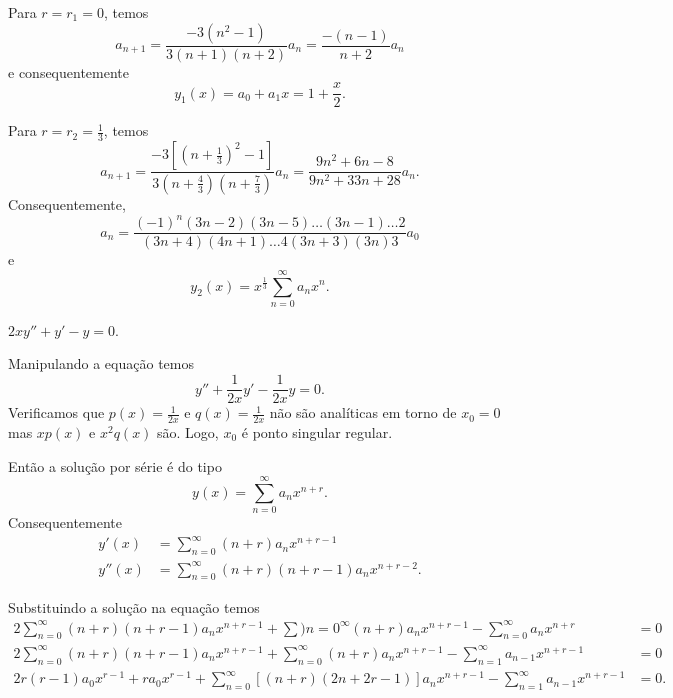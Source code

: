 \documentclass[a4paper,12pt, leqno, answers]{exam}
\begin{document}
\begin{questions}
\begin{solution}
        Para $r = r_1 = 0$, temos
        \[
        a_{n + 1} = \frac{-3 \left( n^2 - 1 \right)}{3 \left( n + 1 \right) \left( n + 2 \right)} a_n = \frac{-\left( n - 1 \right)}{n + 2} a_n
        \]
        e consequentemente
        \[
        y_1(x) = a_0 + a_1 x = 1 + \frac{x}{2}.
        \]

        Para $r = r_2 = \frac{1}{3}$, temos
        \[
        a_{n + 1} = \frac{-3\left[ \left( n + \frac{1}{3} \right)^2 - 1 \right]}{3 \left( n + \frac{4}{3} \right) \left( n + \frac{7}{3} \right)} a_n = \frac{9n^2 + 6n - 8}{9n^2 + 33 n + 28} a_n.
        \]
        Consequentemente,
        \[
        a_n = \frac{\left( -1 \right)^n \left( 3n - 2 \right) \left( 3n - 5 \right) \ldots \left( 3n - 1 \right) \ldots 2}{\left( 3n + 4 \right) \left( 4n + 1 \right) \ldots 4 \left( 3n + 3 \right) \left( 3n \right) 3} a_0
        \]
        e
        \[
        y_2(x) = x^{\frac{1}{3}} \sum_{n = 0}^\infty a_n x^n.
        \]
    \end{solution}

    \question $2 x y'' + y' - y = 0$.
    \begin{solution}
        Manipulando a equa\c{c}\~{a}o temos
        \[
        y'' + \frac{1}{2x} y' - \frac{1}{2x} y = 0.
        \]
        Verificamos que $p(x) = \frac{1}{2x}$ e $q(x) = \frac{1}{2x}$ n\~{a}o s\~{a}o anal\'{i}ticas em torno de $x_0 = 0$ mas $x p(x)$ e $x^2 q(x)$ s\~{a}o. Logo, $x_0$ \'{e} ponto singular regular.

        Ent\~{a}o a solu\c{c}\~{a}o por s\'{e}rie \'{e} do tipo
        \[
        y\left( x \right) = \sum_{n = 0}^\infty a_n x^{n + r}.
        \]
        Consequentemente
        \begin{align*}
            y'(x) &= \sum_{n = 0}^\infty \left( n + r \right) a_n x^{n + r - 1} \\
            y''(x) &= \sum_{n = 0}^\infty \left( n + r \right) \left( n + r - 1 \right) a_n x^{n + r - 2}.
        \end{align*}

        Substituindo a solu\c{c}\~{a}o na equa\c{c}\~{a}o temos
        \begin{align*}
            2 \sum_{n = 0}^\infty \left( n + r \right) \left( n + r - 1 \right) a_n x^{n + r - 1} + \sum){n = 0}^\infty \left( n + r \right) a_n x^{n + r - 1} - \sum_{n = 0}^\infty a_n x^{n + r} &=0 \\
            2 \sum_{n = 0}^\infty \left( n + r \right) \left( n + r - 1 \right) a_n x^{n + r - 1} + \sum_{n = 0}^\infty \left( n + r \right) a_n x^{n + r - 1} - \sum_{n = 1}^\infty a_{n - 1} x^{n + r - 1} &= 0 \\
            2 r \left( r - 1 \right) a_0 x^{r - 1} + r a_0 x^{r - 1} + \sum_{n = 0}^\infty \left[ \left( n + r \right) \left( 2n + 2r - 1 \right) \right] a_n x^{n + r - 1} - \sum_{n = 1}^\infty a_{n - 1} x^{n + r - 1} &= 0.
        \end{align*}


\end{solution}
\end{questions}
\end{document}
